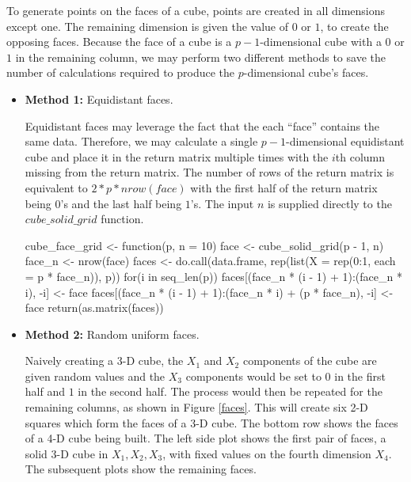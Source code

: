 To generate points on the faces of a cube, points are created in all dimensions
except one. The remaining dimension is given the value of $0$ or $1$, to create
the opposing faces.  Because the face of a cube is a $p-1$-dimensional cube with a
$0$ or $1$ in the remaining column, we may perform two different methods to save
the number of calculations required to produce the $p$-dimensional cube's faces.

\begin{itemize}

  \item {\bf Method 1:} Equidistant faces.

  Equidistant faces may leverage the fact that the each ``face'' contains the same data.  Therefore, we may calculate a single $p-1$-dimensional equidistant cube and place it in the return matrix multiple times with the $i$th column missing from the return matrix.  The number of rows of the return matrix is equivalent to $2 * p * nrow(face)$ with the first half of the return matrix being $0$'s and the last half being $1$'s.  The input $n$ is supplied directly to the $cube\_solid\_grid$ function.

\begin{example}
cube_face_grid <- function(p, n = 10) {
  face <- cube_solid_grid(p - 1, n)
  face_n <- nrow(face)
  faces <- do.call(data.frame, rep(list(X = rep(0:1, each = p * face_n)), p))
  for(i in seq_len(p)) {
    faces[(face_n * (i - 1) + 1):(face_n * i), -i] <- face
    faces[(face_n * (i - 1) + 1):(face_n * i) + (p * face_n), -i] <- face
  }
  return(as.matrix(faces))
}
\end{example}

  \item {\bf Method 2:} Random uniform faces.

  Naively creating a 3-D cube, the $X_1$ and $X_2$ components of the cube are given random values and the $X_3$ components would be set to $0$ in the first
  half and $1$ in the second half. The process would then be repeated for
  the remaining columns, as shown in Figure \ref{faces}. This will
  create six 2-D squares which form the faces of a 3-D cube. The bottom row shows the faces of a 4-D cube being built. The
  left side plot shows the first pair of faces, a solid 3-D cube in
  $X_1, X_2, X_3$, with fixed values on the fourth dimension $X_4$. The
  subsequent plots show the remaining faces.


\end{itemize}
